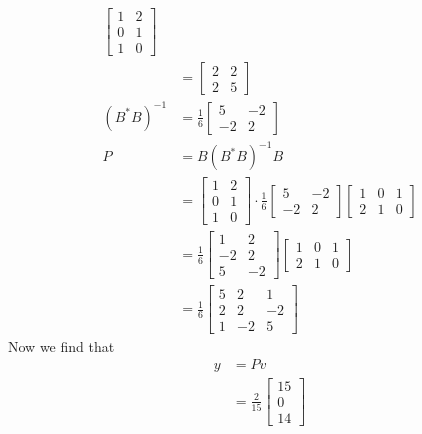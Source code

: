 \documentclass[12pt]{article}
\newenvironment{sol}[1][Solution]{\begin{trivlist}
		\item[\hskip \labelsep {\bfseries #1:}]}{\end{trivlist}}
\begin{document}
\begin{sol}
\begin{enumerate}[label=(\alph*)]
\begin{align*}
\begin{bmatrix}
				1 & 2\\
				0 & 1\\
				1 & 0
			\end{bmatrix}\\
			&=\begin{bmatrix}
				2 & 2\\
				2 & 5
			\end{bmatrix}\\
			(B^*B)^{-1}&=
			\frac{1}{6}
			\begin{bmatrix}
				5 & -2\\
				-2 & 2
			\end{bmatrix}\\
			P&=B(B^*B)^{-1}B\\
			&=\begin{bmatrix}
				1 & 2\\
				0 & 1\\
				1 & 0
			\end{bmatrix}
			\cdot \frac{1}{6}
			\begin{bmatrix}
				5 & -2\\
				-2 & 2
			\end{bmatrix}
			\begin{bmatrix}
				1 & 0 & 1\\
				2 & 1 & 0
			\end{bmatrix}\\
			&=\frac{1}{6}
			\begin{bmatrix}
				1 & 2 \\
				-2 & 2\\
				5 & -2
			\end{bmatrix}
			\begin{bmatrix}
				1 & 0 & 1\\
				2 & 1 & 0
			\end{bmatrix}\\
			&=\frac{1}{6}
			\begin{bmatrix}
				5 & 2 & 1\\
				2 & 2 & -2\\
				1 & -2 & 5
			\end{bmatrix}
		\end{align*}
		Now we find that
		\begin{align*}
			y&=Pv\\
			&=\frac{2}{15}\begin{bmatrix}
				15\\
				0\\
				14
			\end{bmatrix}
		\end{align*}
	\end{enumerate}
\end{sol}
\end{document}
